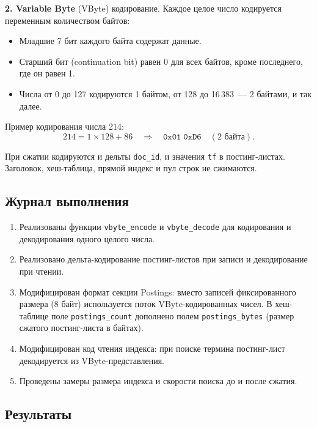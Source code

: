 \documentclass[a4paper,12pt]{article}
\begin{document}
\textbf{2. Variable Byte} (VByte) кодирование. Каждое целое число кодируется переменным количеством байтов:
\begin{itemize}
    \item Младшие 7 бит каждого байта содержат данные.
    \item Старший бит (continuation bit) равен 0 для всех байтов, кроме последнего, где он равен 1.
    \item Числа от 0 до 127 кодируются 1 байтом, от 128 до 16\,383~--- 2 байтами, и так далее.
\end{itemize}

Пример кодирования числа 214:
\[
    214 = 1 \times 128 + 86 \quad\Rightarrow\quad \texttt{0x01}\;\texttt{0xD6} \quad (2 \text{ байта}).
\]

При сжатии кодируются и дельты \texttt{doc\_id}, и значения \texttt{tf} в постинг-листах. Заголовок, хеш-таблица, прямой индекс и пул строк не сжимаются.

\subsection{Журнал выполнения}

\begin{enumerate}
    \item Реализованы функции \texttt{vbyte\_encode} и \texttt{vbyte\_decode} для кодирования и декодирования одного целого числа.
    \item Реализовано дельта-кодирование постинг-листов при записи и декодирование при чтении.
    \item Модифицирован формат секции Postings: вместо записей фиксированного размера (8 байт) используется поток VByte-кодированных чисел. В хеш-таблице поле \texttt{postings\_count} дополнено полем \texttt{postings\_bytes} (размер сжатого постинг-листа в байтах).
    \item Модифицирован код чтения индекса: при поиске термина постинг-лист декодируется из VByte-представления.
    \item Проведены замеры размера индекса и скорости поиска до и после сжатия.
\end{enumerate}

\subsection{Результаты}
\end{document}
